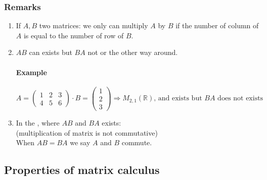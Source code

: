 \documentclass[notitlepage]{math}
\begin{document}
\subsubsection{Remarks}
\begin{enumerate}[label=\protect\circled{R\arabic*}]
    \item If $A,B$ two matrices: we only can multiply $A$ by $B$ if the number of column of $A$ is equal to the number of row of $B$.
    \item $AB$ can exists but $BA$ not or the other way around.
        \paragraph{Example}
        \[A = \begin{pmatrix}
            1 & 2 & 3\\
            4 & 5 & 6
        \end{pmatrix} \cdot B = \begin{pmatrix}
            1 \\
            2 \\
            3
        \end{pmatrix} \Rightarrow M_{2,1}(\mathbb{R}) \text{, and exists but } BA \text{ does not exists}\]
    \item In the , where $AB$ and $BA$ exists:\\
    {} (multiplication of matrix is not commutative)\\
    When $AB = BA$ we say $A$ and $B$ commute. 
\end{enumerate}
\subsection{Properties of matrix calculus}
\end{document}
